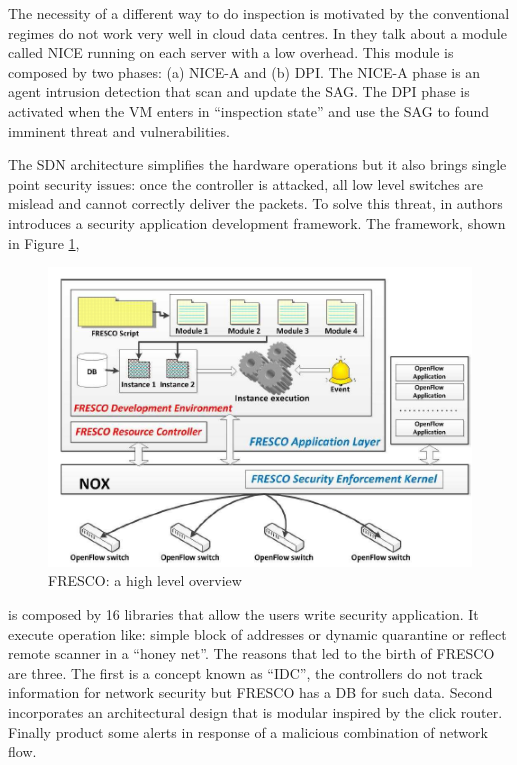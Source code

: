 The necessity of a different way to do inspection is motivated by the conventional regimes do not work very well in cloud data centres. In \cite{sdn-and-openflow-from-concept-to-implementation:NICE} they talk about a module called \ac{NICE} running on each server with a low overhead. This module is composed by two phases: (a) \ac{NICE}-A and (b) \ac{DPI}. The \ac{NICE}-A phase is an agent intrusion detection that scan and update the \ac{SAG}. The \ac{DPI} phase is activated when the \ac{VM} enters in ``inspection state'' and use the \ac{SAG} to found imminent threat and vulnerabilities.

The \ac{SDN} architecture simplifies the hardware operations but it also brings single point security issues: once the controller is attacked, all low level switches are mislead and cannot correctly deliver the packets. To solve this threat, in \cite{fresco-services} authors introduces a security application development framework. The framework, shown in Figure \ref{fig:security-enhancement-using-SDN:FRESCO},

\begin{figure}
\centering
\includegraphics[scale=0.5]{Introduction/Image/FrescoStructure.png}
\caption{FRESCO: a high level overview}
\label{fig:security-enhancement-using-SDN:FRESCO}
\end{figure}

is composed by 16 libraries that allow the users write security application. It execute operation like: simple block of addresses or dynamic quarantine or reflect remote scanner in a ``honey net''. The reasons that led to the birth of FRESCO are three. The first is a concept known as ``\ac{IDC}'', the controllers do not track information for network security but FRESCO has a \ac{DB} for such data. Second incorporates an architectural design that is modular inspired by the click router. Finally product some alerts in response of a malicious combination of network flow.

